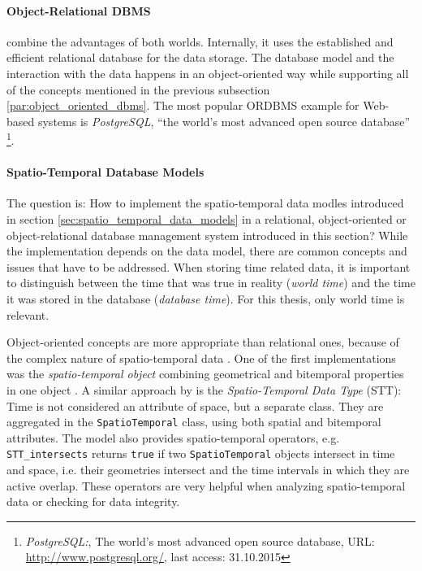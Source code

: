 

\paragraph{Object-Relational DBMS} %
\label{par:object_relational_dbms}

combine the advantages of both worlds. Internally, it uses the established and efficient relational database for the data storage. The database model and the interaction with the data happens in an object-oriented way while supporting all of the concepts mentioned in the previous subsection \ref{par:object_oriented_dbms}. The most popular ORDBMS example for Web-based systems is \emph{PostgreSQL}, ``the world's most advanced open source database''
\footnote{
  \emph{PostgreSQL:},
  The world's most advanced open source database,
  URL: \url{http://www.postgresql.org/},
  last access: 31.10.2015
}.



\paragraph{Spatio-Temporal Database Models} %
\label{par:spatio_temporal_database_models}

The question is: How to implement the spatio-temporal data modles introduced in section \ref{sec:spatio_temporal_data_models} in a relational, object-oriented or object-relational database management system introduced in this section? While the implementation depends on the data model, there are common concepts and issues that have to be addressed. When storing time related data, it is important to distinguish between the time that was true in reality (\emph{world time}) and the time it was stored in the database (\emph{database time}). For this thesis, only world time is relevant.

Object-oriented concepts are more appropriate than relational ones, because of the complex nature of spatio-temporal data \cite[section 3.9]{pelekis04stdms}. One of the first implementations was the \emph{spatio-temporal object} combining geometrical and bitemporal properties in one object \cite{worboys90stdm}. A similar approach by \cite{raza12} is the \emph{Spatio-Temporal Data Type} (STT): Time is not considered an attribute of space, but a separate class. They are aggregated in the \texttt{SpatioTemporal} class, using both spatial and bitemporal attributes. The model also provides spatio-temporal operators, e.g. \texttt{STT\_intersects} returns \texttt{true} if two \texttt{SpatioTemporal} objects intersect in time and space, i.e. their geometries intersect and the time intervals in which they are active overlap. These operators are very helpful when analyzing spatio-temporal data or checking for data integrity.

